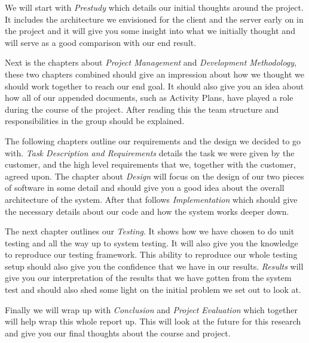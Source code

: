     We will start with \emph{Prestudy} which details our initial thoughts around the project. It includes the architecture we envisioned for the client and the server early on in the project and it will give you some insight into what we initially thought and will serve as a good comparison with our end result.
    
    Next is the chapters about \emph{Project Management} and \emph{Development Methodology}, these two chapters combined should give an impression about how we thought we should work together to reach our end goal. It should also give you an idea about how all of our appended documents, such as Activity Plans, have played a role during the course of the project. After reading this the team structure and responsibilities in the group should be explained.
    
    The following chapters outline our requirements and the design we decided to go with. \emph{Task Description and Requirements} details the task we were given by the customer, and the high level requirements that we, together with the customer, agreed upon. The chapter about \emph{Design} will focus on the design of our two pieces of software in some detail and should give you a good idea about the overall architecture of the system. After that follows \emph{Implementation} which should give the necessary details about our code and how the system works deeper down.
    
    The next chapter outlines our \emph{Testing}. It shows how we have chosen to do unit testing and all the way up to system testing. It will also give you the knowledge to reproduce our testing framework. This ability to reproduce our whole testing setup should also give you the confidence that we have in our results. \emph{Results} will give you our interpretation of the results that we have gotten from the system test and should also shed some light on the initial problem we set out to look at.
    
    Finally we will wrap up with \emph{Conclusion} and \emph{Project Evaluation} which together will help wrap this whole report up. This will look at the future for this research and give you our final thoughts about the course and project.
    
    
